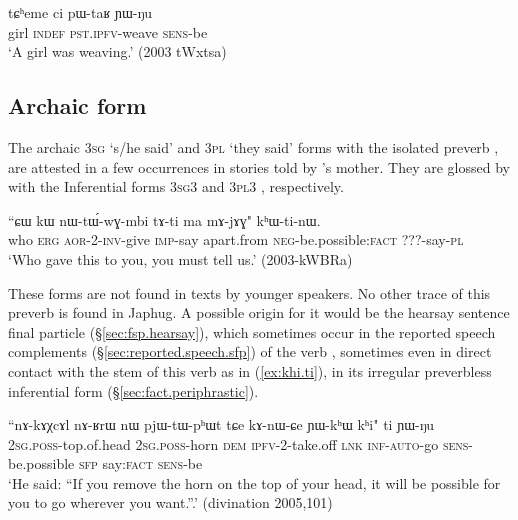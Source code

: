 \begin{exe}
\ex \label{ex:pWtaR.YWNu}
\gll tɕʰeme ci pɯ-taʁ ɲɯ-ŋu \\
girl \textsc{indef} \textsc{pst}.\textsc{ipfv}-weave \textsc{sens}-be \\
\glt `A girl was weaving.' (2003 tWxtsa)
\end{exe}

\subsection{Archaic form} \label{sec:khWti}
The archaic \textsc{3sg}  `s/he said' and \textsc{3pl}  `they said' forms with the isolated preverb , are attested in a few occurrences in stories told by 's mother. They are glossed by  with the Inferential forms \textsc{3sg}\fl{}3  and \textsc{3pl}\fl{}3 , respectively. 

\begin{exe}
\ex \label{ex:khWtinW}
\gll ``ɕɯ kɯ nɯ-tɯ́-wɣ-mbi tɤ-ti ma mɤ-jɤɣ" kʰɯ-ti-nɯ. \\
who \textsc{erg} \textsc{aor}-2-\textsc{inv}-give \textsc{imp}-say apart.from \textsc{neg}-be.possible:\textsc{fact} ???-say-\textsc{pl} \\
\glt `Who gave this to you, you must tell us.' (2003-kWBRa)
\end{exe}

These forms are not found in texts by younger speakers. No other trace of this preverb is found in Japhug. A possible origin for it would be the hearsay sentence final particle  (§\ref{sec:fsp.hearsay}), which sometimes occur in the reported speech complements (§\ref{sec:reported.speech.sfp}) of the verb , sometimes even in direct contact with the stem of this verb as in (\ref{ex:khi.ti}), in its irregular preverbless inferential form (§\ref{sec:fact.periphrastic}).

\begin{exe}
\ex \label{ex:khi.ti}
 \gll ``nɤ-kɤχcɤl nɤ-ʁrɯ nɯ pjɯ-tɯ-pʰɯt tɕe kɤ-nɯ-ɕe ɲɯ-kʰɯ kʰi" ti ɲɯ-ŋu\\
 \textsc{2sg}.\textsc{poss}-top.of.head \textsc{2sg}.\textsc{poss}-horn \textsc{dem} \textsc{ipfv}-2-take.off \textsc{lnk} \textsc{inf}-\textsc{auto}-go \textsc{sens}-be.possible \textsc{sfp} say:\textsc{fact} \textsc{sens}-be \\
 \glt `He said: ``If you remove the horn on the top of your head, it will be possible for you to go wherever you want.''.' (divination 2005,101)
\end{exe}


